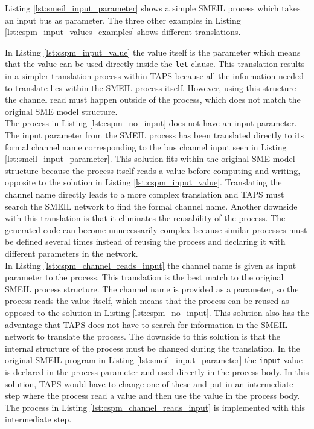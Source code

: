 Listing \ref{lst:smeil_input_parameter} shows a simple SMEIL process which takes an input bus as parameter. The three other examples in Listing \ref{lst:cspm_input_values_examples} shows different translations.

In Listing \ref{lst:cspm_input_value} the value itself is the parameter which means that the value can be used directly inside the \texttt{let} clause.
This translation results in a simpler translation process within TAPS because all the information needed to translate lies within the SMEIL process itself. However, using this structure the channel read must happen outside of the process, which does not match the original SME model structure. \\

The \cspm{} process in Listing \ref{lst:cspm_no_input} does not have an input parameter. The input parameter from the SMEIL process has been translated directly to its formal channel name corresponding to the bus channel input seen in Listing \ref{lst:smeil_input_parameter}. This solution fits within the original SME model structure because the process itself reads a value before computing and writing, opposite to the solution in Listing \ref{lst:cspm_input_value}. Translating the channel name directly leads to a more complex translation and TAPS must search the SMEIL network to find the formal channel name. Another downside with this translation is that it eliminates the reusability of the process. The generated code can become unnecessarily complex because similar processes must be defined several times instead of reusing the process and declaring it with different parameters in the network.\\

In Listing \ref{lst:cspm_channel_reads_input} the channel name is given as input parameter to the \cspm{} process. This translation is the best match to the original SMEIL process structure. The channel name is provided as a parameter, so the process reads the value itself, which means that the process can be reused as opposed to the solution in Listing \ref{lst:cspm_no_input}. This solution also has the advantage that TAPS does not have to search for information in the SMEIL network to translate the process.
The downside to this solution is that the internal structure of the process must be changed during the translation. In the original SMEIL program in Listing \ref{lst:smeil_input_parameter} the \texttt{input} value is declared in the process parameter and used directly in the process body. In this solution, TAPS would have to change one of these and put in an intermediate step where the process read a value and then use the value in the process body. The process in Listing \ref{lst:cspm_channel_reads_input} is implemented with this intermediate step.\\

